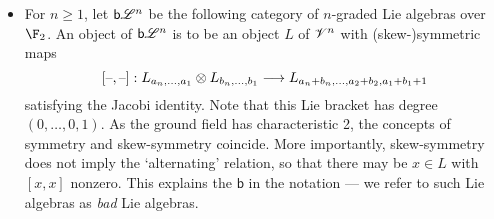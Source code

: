 \documentclass[11pt]{article}
\newcommand{\BadLie}[1]{\mathsf{b}{\scrL}^{#1}}%
\newcommand{\GR}[1]{\scrV^{#1}}%
\begin{document}
\begin{CategoriesOfInterest}
\begin{itemize}
\setlength{\parindent}{.25in}
\item For $n\geq1$, let $\BadLie{n}$ be the following category of $n$-graded Lie algebras over $\F_2$. An object of $\BadLie{n}$ is to be an object $L$ of $\GR{n}$ with (skew-)symmetric maps
\[[\textup{--},\textup{--}]:L_{a_n,\ldots,a_1}\otimes L_{b_n,\ldots,b_1}\longrightarrow L_{a_n+b_n,\ldots,a_2+b_2,a_1+b_1+1}\]
satisfying the Jacobi identity. Note that this Lie bracket has degree $(0,\ldots,0,1)$. As the ground field has characteristic 2, the concepts of symmetry and skew-symmetry coincide. More importantly, skew-symmetry does not imply the `alternating' relation, so that there may be $x\in L$ with $[x,x]$ nonzero. This explains the $\mathsf{b}$ in the notation --- we refer to such Lie algebras as \emph{bad} Lie algebras.


\end{itemize}
\end{CategoriesOfInterest}
\end{document}
